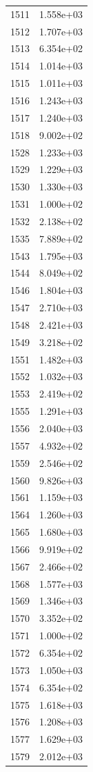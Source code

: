 \documentclass[12pt]{article}
\begin{document}
\begin{longtable}{@{}cc@{}}
1511 & 1.558e+03 \\
1512 & 1.707e+03 \\
1513 & 6.354e+02 \\
1514 & 1.014e+03 \\
1515 & 1.011e+03 \\
1516 & 1.243e+03 \\
1517 & 1.240e+03 \\
1518 & 9.002e+02 \\
1528 & 1.233e+03 \\
1529 & 1.229e+03 \\
1530 & 1.330e+03 \\
1531 & 1.000e+02 \\
1532 & 2.138e+02 \\
1535 & 7.889e+02 \\
1543 & 1.795e+03 \\
1544 & 8.049e+02 \\
1546 & 1.804e+03 \\
1547 & 2.710e+03 \\
1548 & 2.421e+03 \\
1549 & 3.218e+02 \\
1551 & 1.482e+03 \\
1552 & 1.032e+03 \\
1553 & 2.419e+02 \\
1555 & 1.291e+03 \\
1556 & 2.040e+03 \\
1557 & 4.932e+02 \\
1559 & 2.546e+02 \\
1560 & 9.826e+03 \\
1561 & 1.159e+03 \\
1564 & 1.260e+03 \\
1565 & 1.680e+03 \\
1566 & 9.919e+02 \\
1567 & 2.466e+02 \\
1568 & 1.577e+03 \\
1569 & 1.346e+03 \\
1570 & 3.352e+02 \\
1571 & 1.000e+02 \\
1572 & 6.354e+02 \\
1573 & 1.050e+03 \\
1574 & 6.354e+02 \\
1575 & 1.618e+03 \\
1576 & 1.208e+03 \\
1577 & 1.629e+03 \\
1579 & 2.012e+03 \\

\end{longtable}
\end{document}
